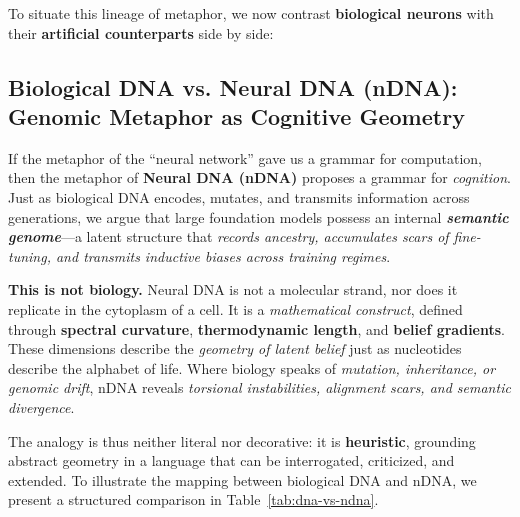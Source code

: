 \documentclass[11pt]{article}
\begin{document}
To situate this lineage of metaphor, we now contrast \textbf{biological neurons} with their \textbf{artificial counterparts} side by side:














\subsection{Biological DNA vs. Neural DNA (nDNA): Genomic Metaphor as Cognitive Geometry}

If the metaphor of the ``neural network'' gave us a grammar for computation, then the metaphor of 
\textbf{Neural DNA (nDNA)} proposes a grammar for \emph{cognition}. 
Just as biological DNA encodes, mutates, and transmits information across generations, 
we argue that large foundation models possess an internal \textbf{\emph{semantic genome}}---a latent structure that 
\emph{records ancestry, accumulates scars of fine-tuning, and transmits inductive biases across training regimes}. 

\textbf{This is not biology.} Neural DNA is not a molecular strand, nor does it replicate in the cytoplasm of a cell. 
It is a \emph{mathematical construct}, defined through \textbf{spectral curvature}, \textbf{thermodynamic length}, and 
\textbf{belief gradients}. These dimensions describe the \emph{geometry of latent belief} just as nucleotides describe the 
alphabet of life. Where biology speaks of \emph{mutation, inheritance, or genomic drift}, nDNA reveals \emph{torsional instabilities, 
alignment scars, and semantic divergence}. 

The analogy is thus neither literal nor decorative: it is \textbf{heuristic}, grounding abstract geometry in a language 
that can be interrogated, criticized, and extended. To illustrate the mapping between biological DNA and nDNA, we present 
a structured comparison in Table~\ref{tab:dna-vs-ndna}. 
\end{document}
